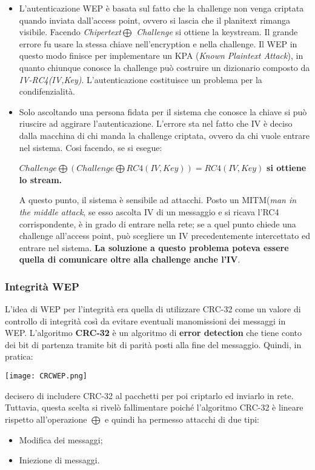 \documentclass{article}
\theoremstyle{remark}
\begin{document}
\begin{itemize}
    \item L'autenticazione WEP è basata sul fatto che la challenge non venga criptata quando inviata dall'access point, ovvero si lascia che il planitext rimanga visibile. Facendo \emph{Chipertext$\bigoplus$ Challenge} si ottiene la keystream. Il grande errore fu usare la stessa chiave nell'encryption e nella challenge. Il WEP in questo modo finisce per implementare un KPA (\emph{Known Plaintext Attack}), in quanto chiunque conosce la challenge può costruire un dizionario composto da \emph{IV-RC4(IV,Key)}. L'autenticazione costituisce un problema per la condifenzialità.
    \item Solo ascoltando una persona fidata per il sistema che conosce la chiave si può riuscire ad aggirare l'autenticazione. L'errore sta nel fatto che IV è deciso dalla macchina di chi manda la challenge criptata, ovvero da chi vuole entrare nel sistema. Cosi facendo, se si esegue:\begin{center}
        $Challenge\bigoplus (Challenge \bigoplus RC4(IV,Key))=RC4(IV,Key)$ \textbf{si ottiene lo stream.}
    \end{center}
    A questo punto, il sistema è sensibile ad attacchi. Posto un MITM(\emph{man in the middle attack}, se esso ascolta IV di un messaggio e si ricava l'RC4 corrispondente, è in grado di entrare nella rete; se a quel punto chiede una challenge all'access point, può scegliere un IV precedentemente intercettato ed entrare nel sistema.\newline
    \textbf{La soluzione a questo problema poteva essere quella di comunicare oltre alla challenge anche l'IV}.
\end{itemize}
\subsubsection{Integrità WEP}
L'idea di WEP per l'integrità era quella di utilizzare CRC-32 come un valore di controllo di integrità così da evitare eventuali manomissioni dei messaggi in WEP.
L'algoritmo \textbf{CRC-32} è un algoritmo di \textbf{error detection} che tiene conto dei bit di partenza tramite bit di parità posti alla fine del messaggio. Quindi, in pratica:
\begin{center}
    \texttt{[image: CRCWEP.png]}
\end{center}
decisero di includere CRC-32 al pacchetti per poi criptarlo ed inviarlo in rete. Tuttavia, questa scelta si rivelò fallimentare poiché l'algoritmo CRC-32 è lineare rispetto all'operazione $\bigoplus$ e quindi ha permesso attacchi di due tipi:
\begin{itemize}
    \item Modifica dei messaggi;
    \item Iniezione di messaggi.
\end{itemize}
\end{document}
